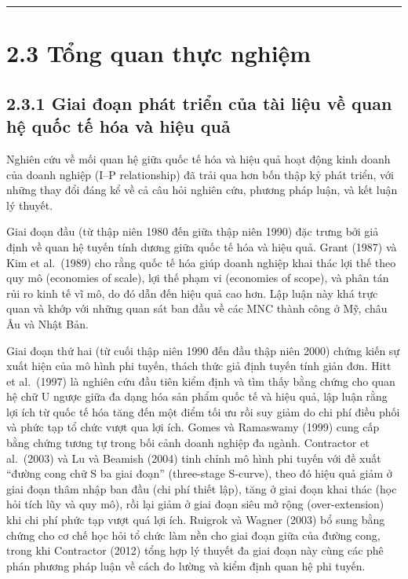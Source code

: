 \documentclass[
  a4paper,
  13pt]{extreport}
\begin{document}
\begin{center}\rule{0.5\linewidth}{0.5pt}\end{center}

\hypertarget{tux1ed5ng-quan-thux1ef1c-nghiux1ec7m}{%
\section{2.3 Tổng quan thực
nghiệm}\label{tux1ed5ng-quan-thux1ef1c-nghiux1ec7m}}

\hypertarget{giai-ux111oux1ea1n-phuxe1t-triux1ec3n-cux1ee7a-tuxe0i-liux1ec7u-vux1ec1-quan-hux1ec7-quux1ed1c-tux1ebf-huxf3a-vuxe0-hiux1ec7u-quux1ea3}{%
\subsection{2.3.1 Giai đoạn phát triển của tài liệu về quan hệ quốc tế
hóa và hiệu
quả}\label{giai-ux111oux1ea1n-phuxe1t-triux1ec3n-cux1ee7a-tuxe0i-liux1ec7u-vux1ec1-quan-hux1ec7-quux1ed1c-tux1ebf-huxf3a-vuxe0-hiux1ec7u-quux1ea3}}

Nghiên cứu về mối quan hệ giữa quốc tế hóa và hiệu quả hoạt động kinh
doanh của doanh nghiệp (I--P relationship) đã trải qua hơn bốn thập kỷ
phát triển, với những thay đổi đáng kể về cả câu hỏi nghiên cứu, phương
pháp luận, và kết luận lý thuyết.

Giai đoạn đầu (từ thập niên 1980 đến giữa thập niên 1990) đặc trưng bởi
giả định về quan hệ tuyến tính dương giữa quốc tế hóa và hiệu quả. Grant
(1987) và Kim et al.~(1989) cho rằng quốc tế hóa giúp doanh nghiệp khai
thác lợi thế theo quy mô (economies of scale), lợi thế phạm vi
(economies of scope), và phân tán rủi ro kinh tế vĩ mô, do đó dẫn đến
hiệu quả cao hơn. Lập luận này khá trực quan và khớp với những quan sát
ban đầu về các MNC thành công ở Mỹ, châu Âu và Nhật Bản.

Giai đoạn thứ hai (từ cuối thập niên 1990 đến đầu thập niên 2000) chứng
kiến sự xuất hiện của mô hình phi tuyến, thách thức giả định tuyến tính
giản đơn. Hitt et al.~(1997) là nghiên cứu đầu tiên kiểm định và tìm
thấy bằng chứng cho quan hệ chữ U ngược giữa đa dạng hóa sản phẩm quốc
tế và hiệu quả, lập luận rằng lợi ích từ quốc tế hóa tăng đến một điểm
tối ưu rồi suy giảm do chi phí điều phối và phức tạp tổ chức vượt qua
lợi ích. Gomes và Ramaswamy (1999) cung cấp bằng chứng tương tự trong
bối cảnh doanh nghiệp đa ngành. Contractor et al.~(2003) và Lu và
Beamish (2004) tinh chỉnh mô hình phi tuyến với đề xuất ``đường cong chữ
S ba giai đoạn'' (three-stage S-curve), theo đó hiệu quả giảm ở giai
đoạn thâm nhập ban đầu (chi phí thiết lập), tăng ở giai đoạn khai thác
(học hỏi tích lũy và quy mô), rồi lại giảm ở giai đoạn siêu mở rộng
(over-extension) khi chi phí phức tạp vượt quá lợi ích. Ruigrok và
Wagner (2003) bổ sung bằng chứng cho cơ chế học hỏi tổ chức làm nền cho
giai đoạn giữa của đường cong, trong khi Contractor (2012) tổng hợp lý
thuyết đa giai đoạn này cùng các phê phán phương pháp luận về cách đo
lường và kiểm định quan hệ phi tuyến.
\end{document}
